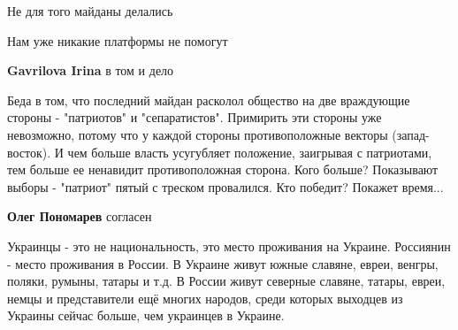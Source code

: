 \begin{itemize}
Не для того майданы делались

 
Нам уже никакие платформы не помогут

\begin{itemize}
 
\textbf{Gavrilova Irina} в том и дело
\end{itemize}

 

Беда в том, что последний майдан расколол общество на две враждующие стороны -
"патриотов" и "сепаратистов". Примирить эти стороны уже невозможно, потому что
у каждой стороны противоположные векторы (запад-восток). И чем больше власть
усугубляет положение, заигрывая с патриотами, тем больше ее ненавидит
противоположная сторона. Кого больше? Показывают выборы - "патриот" пятый с
треском провалился. Кто победит? Покажет время...

\begin{itemize}
 
\textbf{Олег Пономарев} согласен
\end{itemize}

 

Украинцы - это не национальность, это место проживания на Украине. Россиянин -
место проживания в России. В Украине живут южные славяне, евреи, венгры,
поляки, румыны, татары и т.д. В России живут северные славяне, татары, евреи,
немцы и представители ещё многих народов, среди которых выходцев из Украины
сейчас больше, чем украинцев в Украине.



\end{itemize}
